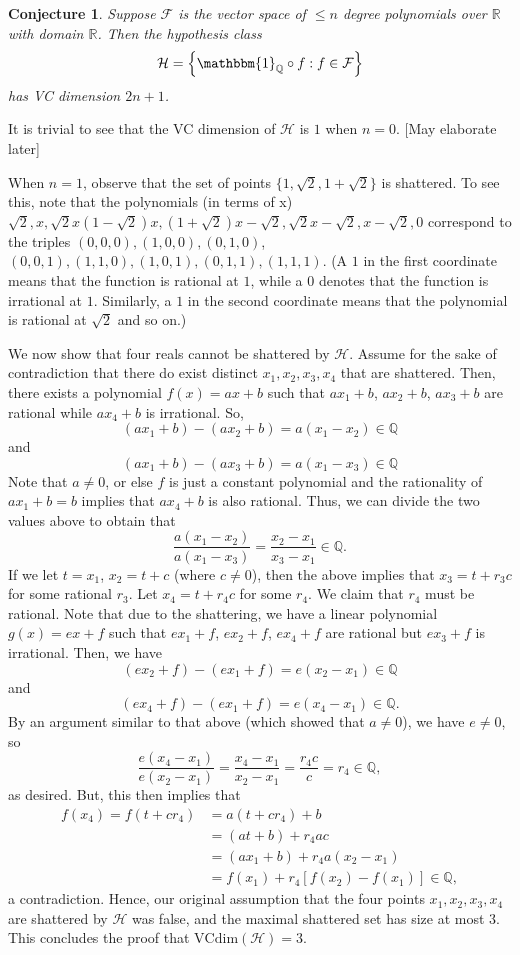\documentclass{article}
\newtheorem{conjecture}[theorem]{Conjecture}
\begin{document}
\begin{conjecture}
Suppose $\mathcal{F}$ is the vector space of $\le n$ degree polynomials over $\mathbb{R}$ with domain $\mathbb{R}$. Then the hypothesis class 
$$
\mathcal{H} = \left\{\mathbbm{1}_{\mathbb{Q}} \circ f : f \in \mathcal{F}\right\}
$$
has VC dimension $2n+1$.
\end{conjecture}

It is trivial to see that the VC dimension of $\mathcal{H}$ is $1$ when $n=0$. [May elaborate later]

When $n=1$, observe that the set of points $\{1, \sqrt{2}, 1 + \sqrt 2\}$ is shattered. To see this, note that the polynomials (in terms of x) $\sqrt{2}, x, \sqrt{2}x (1-\sqrt2)x, (1+\sqrt{2})x - \sqrt{2}, \sqrt{2}x - \sqrt{2}, x - \sqrt{2}, 0$ correspond to the triples $(0,0,0), (1,0,0), (0,1,0)$, $(0,0,1), (1,1,0), (1,0,1), (0,1,1), (1,1,1)$. (A $1$ in the first coordinate means that the function is rational at $1$, while a $0$ denotes that the function is irrational at $1$. Similarly, a $1$ in the second coordinate means that the polynomial is rational at $\sqrt2$ and so on.)

We now show that four reals cannot be shattered by $\mathcal{H}$. Assume for the sake of contradiction that there do exist distinct $x_1, x_2, x_3, x_4$ that are shattered. Then, there exists a polynomial $f(x) = ax+b$ such that $ax_1+b$, $ax_2+b$, $ax_3+b$ are rational while $ax_4 + b$ is irrational. So, 
$$(ax_1+b)-(ax_2+b) = a(x_1-x_2) \in \mathbb{Q}$$ and
$$(ax_1+b)-(ax_3+b) = a(x_1-x_3) \in \mathbb{Q}$$
Note that $a\neq 0$, or else $f$ is just a constant polynomial and the rationality of $ax_1 + b = b$ implies that $ax_4+b$ is also rational. Thus, we can divide the two values above to obtain that
$$
\frac{a(x_1-x_2)}{a(x_1-x_3)} = \frac{x_2-x_1}{x_3-x_1} \in \mathbb{Q}.
$$
If we let $t = x_1$, $x_2 = t+c$ (where $c\neq 0$), then the above implies that $x_3 = t+r_3c$ for some rational $r_3$. Let $x_4 = t+r_4c$ for some $r_4$. We claim that $r_4$ must be rational. Note that due to the shattering, we have a linear polynomial $g(x) = ex+f$ such that $ex_1+f$, $ex_2+f$, $ex_4+f$ are rational but $ex_3+f$ is irrational. Then, we have
$$(ex_2+f) - (ex_1+f) = e(x_2-x_1) \in \mathbb{Q}$$
and
$$(ex_4+f) - (ex_1+f) = e(x_4-x_1) \in \mathbb{Q}.$$
By an argument similar to that above (which showed that $a\neq 0$), we have $e \neq 0$, so 
$$
\frac{e(x_4-x_1)}{e(x_2-x_1)} = \frac{x_4-x_1}{x_2-x_1} = \frac{r_4c}{c} = r_4 \in \mathbb{Q},
$$
as desired. But, this then implies that 
\begin{align*}
    f(x_4) = f(t+cr_4) &= a(t+cr_4) + b \\
    &= (at+b) + r_4ac \\
    &= (ax_1+b) + r_4a(x_2-x_1) \\
    &= f(x_1) + r_4[f(x_2)-f(x_1)] \in \mathbb{Q},
\end{align*}
a contradiction. Hence, our original assumption that the four points $x_1, x_2, x_3, x_4$ are shattered by $\mathcal{H}$ was false, and the maximal shattered set has size at most $3$. This concludes the proof that $\text{VCdim}(\mathcal{H}) = 3$.
\end{document}
